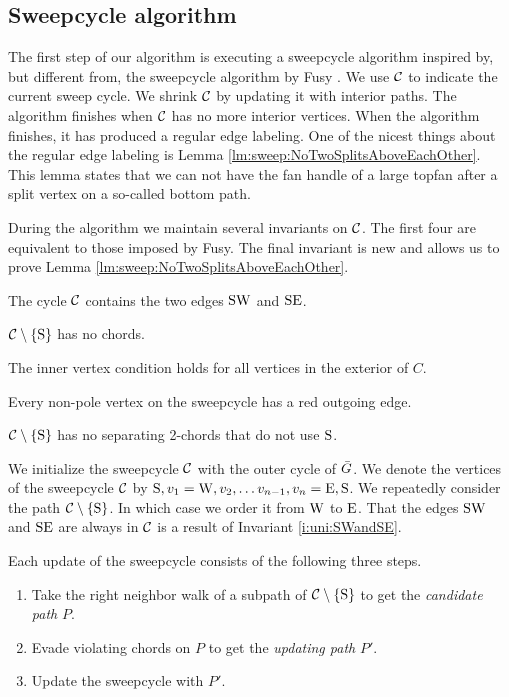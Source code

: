 
\subsection{Sweepcycle algorithm}
\thispagestyle{plain}
\label{ss:sweep}
The first step of our algorithm is executing a sweepcycle algorithm inspired by, but different from, the sweepcycle algorithm by Fusy \cite{Fusy2006}. We use $\mathcal{C}$ to indicate the current sweep cycle. We shrink $\mathcal{C}$ by updating it with interior paths.
The algorithm finishes when $\mathcal{C}$ has no more interior vertices. When the algorithm finishes, it has produced a regular edge labeling.
One of the nicest things about the regular edge labeling is Lemma \ref{lm:sweep:NoTwoSplitsAboveEachOther}.
This lemma states that we can not have the fan handle of a large topfan after a split vertex on a so-called bottom path.

During the algorithm we maintain several invariants on $\mathcal{C}$. The first four are equivalent to those imposed by Fusy. The final invariant is new and allows us to prove Lemma \ref{lm:sweep:NoTwoSplitsAboveEachOther}.

\begin{invariants}
  \itemsep=-4pt
  \item \label{i:uni:SWandSE} The cycle $\mathcal{C}$ contains the two edges $\mathrm{S} \mathrm{W}$ and $\mathrm{S} \mathrm{E}$.
  \item \label{i:uni:noChords} $\mathcal{C} \setminus \left\lbrace {\mathrm{S}} \right\rbrace$ has no chords.
  \item \label{i:uni:intVertCond} The inner vertex condition holds for all vertices in the exterior of $C$.
  \item \label{i:uni:redOutgoing} Every non-pole vertex on the sweepcycle has a red outgoing edge.
  \item \label{i:uni:no2Chords} $\mathcal{C}\setminus \left\lbrace {\mathrm{S}} \right\rbrace$ has no separating 2-chords that do not use $\mathrm{S}$.
\end{invariants}

We initialize the sweepcycle $\mathcal{C}$ with the outer cycle of $\bar{G}$.
We denote the vertices of the sweepcycle $\mathcal{C}$ by $\mathrm{S}, v_1 = \mathrm{W}, v_2, \ldots v_{n-1}, v_n = \mathrm{E}, \mathrm{S}$.
We repeatedly consider the path $\mathcal{C} \setminus \left\lbrace {\mathrm{S}} \right\rbrace$.
In which case we order it from $\mathrm{W}$ to $\mathrm{E}$. That the edges $\mathrm{S} \mathrm{W}$ and $\mathrm{S} \mathrm{E}$ are always in $\mathcal{C}$ is a result of Invariant \ref{i:uni:SWandSE}.


Each update of the sweepcycle consists of the following three steps.
\begin{enumerate}
  \itemsep=-4pt
  \item Take the right neighbor walk of a subpath of $\mathcal{C} \setminus \left\lbrace {\mathrm{S}} \right\rbrace$ to get the \emph{candidate path} $P$.
  \item Evade violating chords on $P$ to get the \emph{updating path} $P'$.
  \item Update the sweepcycle with $P'$.
\end{enumerate}

